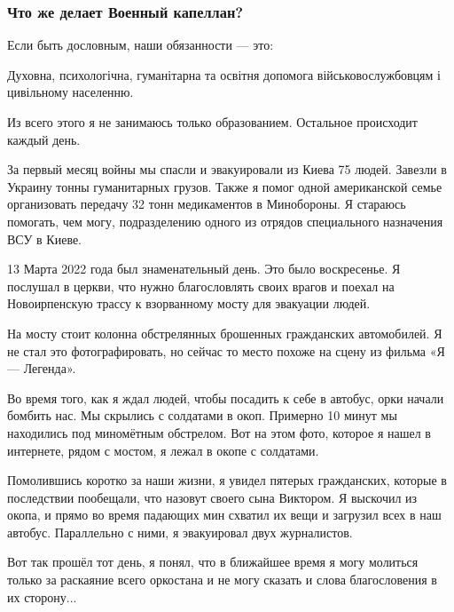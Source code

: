  
 
 
 
 

\subsubsection{Что же делает Военный капеллан?}
\label{sec:29_03_2022.stz.pc.ua.dou.1.kapellan.3.chto_delaet_kapellan}

Если быть дословным, наши обязанности — это:

\begin{zznagolos}
Духовна, психологічна, гуманітарна та освітня допомога військовослужбовцям і
цивільному населенню.
\end{zznagolos}

Из всего этого я не занимаюсь только образованием. Остальное происходит каждый
день.


За первый месяц войны мы спасли и эвакуировали из Киева 75 людей. Завезли в
Украину тонны гуманитарных грузов. Также я помог одной американской семье
организовать передачу 32 тонн медикаментов в Минобороны. Я стараюсь помогать,
чем могу, подразделению одного из отрядов специального назначения ВСУ в Киеве.

13 Марта 2022 года был знаменательный день. Это было воскресенье. Я послушал в
церкви, что нужно благословлять своих врагов и поехал на Новоирпенскую трассу к
взорванному мосту для эвакуации людей.

На мосту стоит колонна обстрелянных брошенных гражданских автомобилей. Я не
стал это фотографировать, но сейчас то место похоже на сцену из фильма «Я —
Легенда».

Во время того, как я ждал людей, чтобы посадить к себе в автобус, орки начали
бомбить нас. Мы скрылись с солдатами в окоп. Примерно 10 минут мы находились
под миномётным обстрелом. Вот на этом фото, которое я нашел в интернете, рядом
с мостом, я лежал в окопе с солдатами.


Помолившись коротко за наши жизни, я увидел пятерых гражданских, которые в
последствии пообещали, что назовут своего сына Виктором. Я выскочил из окопа, и
прямо во время падающих мин схватил их вещи и загрузил всех в наш автобус.
Параллельно с ними, я эвакуировал двух журналистов.

Вот так прошёл тот день, я понял, что в ближайшее время я могу молиться только
за раскаяние всего оркостана и не могу сказать и слова благословения в их
сторону...
